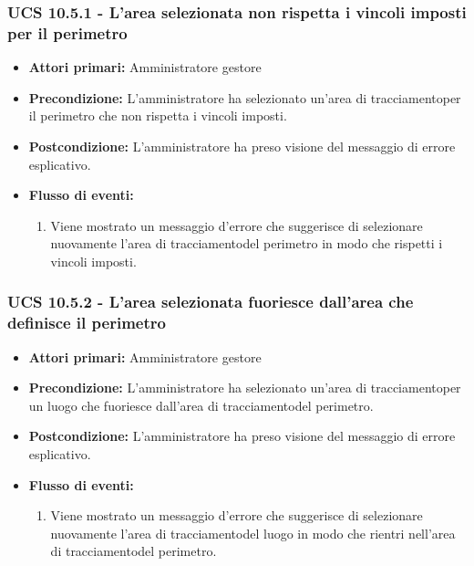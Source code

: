 \subsubsection{UCS 10.5.1 - L'area selezionata non rispetta i vincoli imposti per il perimetro}%
\begin{itemize}
\item \textbf{Attori primari:} Amministratore gestore
\item \textbf{Precondizione:} L'amministratore ha selezionato un'area di tracciamentoper il perimetro che non rispetta i vincoli imposti.
\item \textbf{Postcondizione:} L'amministratore ha preso visione del messaggio di errore esplicativo.
\item \textbf{Flusso di eventi:}
    \begin{enumerate}
    \item Viene mostrato un messaggio d'errore che suggerisce di selezionare nuovamente l'area di tracciamentodel perimetro in modo che rispetti i vincoli imposti.
    \end{enumerate} 
\end{itemize}

\subsubsection{UCS 10.5.2 - L'area selezionata fuoriesce dall'area che definisce il perimetro}%
\begin{itemize}
\item \textbf{Attori primari:} Amministratore gestore
\item \textbf{Precondizione:} L'amministratore ha selezionato un'area di tracciamentoper un luogo che fuoriesce dall'area di tracciamentodel perimetro.
\item \textbf{Postcondizione:} L'amministratore ha preso visione del messaggio di errore esplicativo.
\item \textbf{Flusso di eventi:}
    \begin{enumerate}
    \item Viene mostrato un messaggio d'errore che suggerisce di selezionare nuovamente l'area di tracciamentodel luogo in modo che rientri nell'area di tracciamentodel perimetro.
    \end{enumerate} 
\end{itemize}

